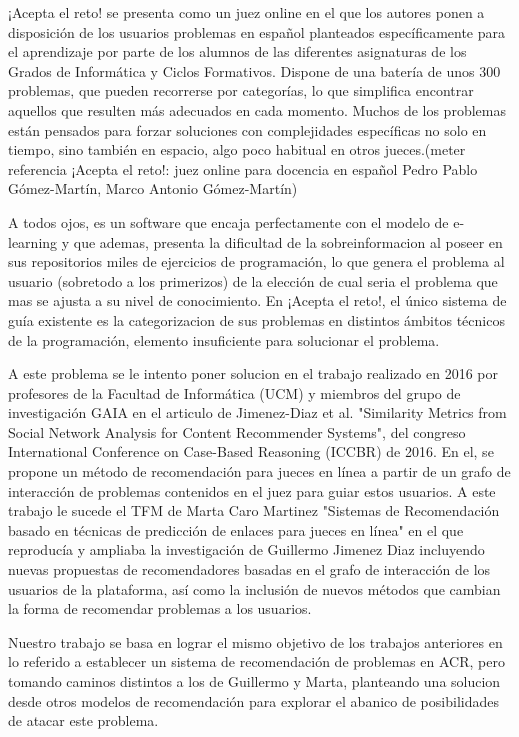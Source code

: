 ¡Acepta el reto! se presenta como un juez online en el que los autores ponen a disposición de los usuarios problemas en español planteados específicamente para el aprendizaje por parte de los alumnos de las diferentes asignaturas de los Grados de Informática y Ciclos Formativos. Dispone de una batería de unos 300 problemas, que pueden recorrerse por categorías, lo que simplifica encontrar aquellos que resulten más adecuados en cada momento. Muchos de los problemas están pensados para forzar soluciones con complejidades específicas no solo en tiempo, sino también en espacio, algo poco habitual en otros jueces.(meter referencia ¡Acepta el reto!: juez online para docencia en español Pedro Pablo Gómez-Martín, Marco Antonio Gómez-Martín)

A todos ojos, es un software que encaja perfectamente con el modelo de e-learning y que ademas, presenta la dificultad de la sobreinformacion al poseer en sus repositorios miles de ejercicios de programación, lo que genera el problema al usuario (sobretodo a los primerizos) de la elección de cual seria el problema que mas se ajusta a su nivel de conocimiento. En ¡Acepta el reto!, el único sistema de guía existente es la categorizacion de sus problemas en distintos ámbitos técnicos de la programación, elemento insuficiente para solucionar el problema. 

A este problema se le intento poner solucion en el trabajo realizado en 2016 por profesores de la Facultad de Informática (UCM) y miembros del grupo de investigación GAIA en el articulo de Jimenez-Diaz et al. "Similarity Metrics from Social Network Analysis for Content Recommender Systems", del congreso International Conference on Case-Based Reasoning (ICCBR) de 2016. En el, se propone un método de recomendación para jueces en línea a partir de un grafo de interacción de problemas contenidos en el juez para guiar estos usuarios. A este trabajo le sucede el TFM de Marta Caro Martinez "Sistemas de Recomendación basado en técnicas de predicción de enlaces para jueces en línea" en el que reproducía y ampliaba la investigación  de Guillermo Jimenez Diaz incluyendo nuevas propuestas de recomendadores basadas en el grafo de interacción de los usuarios de la plataforma, así como la inclusión de nuevos métodos que cambian la forma de recomendar problemas a los usuarios.

Nuestro trabajo se basa en lograr el mismo objetivo de los trabajos anteriores en lo referido a establecer un sistema de recomendación de problemas en ACR, pero tomando caminos distintos a los de Guillermo y Marta, planteando una solucion desde otros modelos de recomendación para explorar el abanico de posibilidades de atacar este problema.


